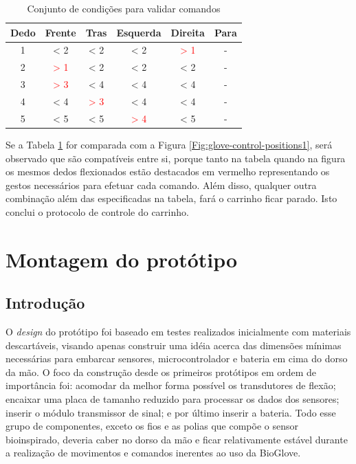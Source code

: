 \documentclass[
	12pt,				%
	openright,			%
	oneside,			%
	a4paper,			%
	english,			%
	brazil				%
	]{abntex2}
\begin{document}
		\begin{table}[H]
     \centering
     \caption{Conjunto de condições para validar comandos}
     \begin{tabular}{c|ccccc}
			 \midrule
			 Dedo &       Frente			 & 				Tras				& 		Esquerda			 & 		Direita					& Para	\\
			 \midrule
			 1    & < 2   						 & < 2   							& < 2    						 &\textcolor{red}{> 1}&	-			\\
			 2    &\textcolor{red}{> 1}& < 2   							& < 2  	 						 & < 2   							&	-			\\
			 3    &\textcolor{red}{> 3}& < 4   							& < 4   						 & < 4   							&	-			\\
			 4    & < 4   						 &\textcolor{red}{> 3}& < 4 							 & < 4   							&	-			\\
			 5    & < 5   						 & < 5   							&\textcolor{red}{> 4}& < 5   							&	-			\\
			 \midrule
     \end{tabular}
     \label{Tab:dedos-e-comandos1}
   \end{table}

		Se a Tabela \ref{Tab:dedos-e-comandos1} for comparada com a Figura \ref{Fig:glove-control-positions1}, será observado que são compatíveis entre si, porque tanto na tabela quando na figura os mesmos dedos flexionados estão destacados em vermelho representando os gestos necessários para efetuar cada comando. Além disso, qualquer outra combinação além das especificadas na tabela, fará o carrinho ficar parado. Isto conclui o protocolo de controle do carrinho.



		\section{Montagem do protótipo}

		
				\subsection{Introdução}	
				

		O \textit{design} do protótipo foi baseado em testes realizados inicialmente com materiais descartáveis, visando apenas construir uma idéia acerca das dimensões mínimas necessárias para embarcar sensores, microcontrolador e bateria em cima do dorso da mão. O foco da construção desde os primeiros protótipos em ordem de importância foi: acomodar da melhor forma possível os transdutores de flexão; encaixar uma placa de tamanho reduzido para processar os dados dos sensores; inserir o módulo transmissor de sinal; e por último inserir a bateria. Todo esse grupo de componentes, exceto os fios e as polias que compõe o sensor bioinspirado, deveria caber no dorso da mão e ficar relativamente estável durante a realização de movimentos e comandos inerentes ao uso da BioGlove.
\end{document}
